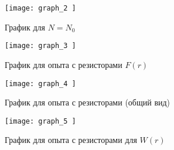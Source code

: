 \begin{figure}[H] 
	\centering
	\texttt{[image:  graph\_2 ]} 
	\caption{График для $N = N_0$}
	
	\label{fig:graph-2} 
\end{figure}

\begin{figure}[H] 
	\centering
	\texttt{[image:  graph\_3 ]} 
	\caption{График для опыта с резисторами $F(r)$}
	
	\label{fig:graph-3} 
\end{figure}

\begin{figure}[H] 
	\centering
	\texttt{[image:  graph\_4 ]} 
	\caption{График для опыта с резисторами (общий вид)}
	
	\label{fig:graph-4} 
\end{figure}

\begin{figure}[H] 
	\centering
	\texttt{[image:  graph\_5 ]} 
	\caption{График для опыта с резисторами для $W(r)$}
	
	\label{fig:graph-5} 
\end{figure}